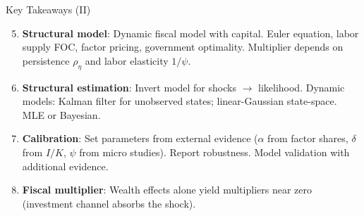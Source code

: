\documentclass[blue]{beamer}
\begin{document}
\begin{frame}{Key Takeaways (II)}
	\begin{enumerate}
		\setcounter{enumi}{4}
		\item \textbf{Structural model}: Dynamic fiscal model with capital. Euler equation, labor supply FOC, factor pricing, government optimality. Multiplier depends on persistence $\rho_\eta$ and labor elasticity $1/\psi$.
		
		\item \textbf{Structural estimation}: Invert model for shocks $\to$ likelihood. Dynamic models: Kalman filter for unobserved states; linear-Gaussian state-space. MLE or Bayesian.
		
		\item \textbf{Calibration}: Set parameters from external evidence ($\alpha$ from factor shares, $\delta$ from $I/K$, $\psi$ from micro studies). Report robustness. Model validation with additional evidence.
		
		\item \textbf{Fiscal multiplier}: Wealth effects alone yield multipliers near zero (investment channel absorbs the shock).
	\end{enumerate}
\end{frame}
\end{document}
